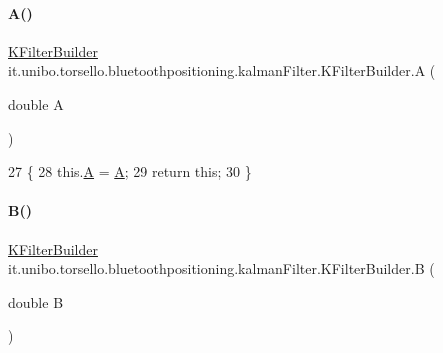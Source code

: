 \paragraph{\texorpdfstring{A()}{A()}}
{\footnotesize\ttfamily \hyperlink{classit_1_1unibo_1_1torsello_1_1bluetoothpositioning_1_1kalmanFilter_1_1KFilterBuilder}{K\+Filter\+Builder} it.\+unibo.\+torsello.\+bluetoothpositioning.\+kalman\+Filter.\+K\+Filter\+Builder.\+A (\begin{DoxyParamCaption}\item[{double}]{A }\end{DoxyParamCaption})}


\begin{DoxyCode}
27                                       \{
28         this.\hyperlink{classit_1_1unibo_1_1torsello_1_1bluetoothpositioning_1_1kalmanFilter_1_1KFilterBuilder_aad2f769a976e0881bc28e382300f6ebd_aad2f769a976e0881bc28e382300f6ebd}{A} = \hyperlink{classit_1_1unibo_1_1torsello_1_1bluetoothpositioning_1_1kalmanFilter_1_1KFilterBuilder_aad2f769a976e0881bc28e382300f6ebd_aad2f769a976e0881bc28e382300f6ebd}{A};
29         \textcolor{keywordflow}{return} \textcolor{keyword}{this};
30     \}
\end{DoxyCode}
\hypertarget{classit_1_1unibo_1_1torsello_1_1bluetoothpositioning_1_1kalmanFilter_1_1KFilterBuilder_af82fc18e727614054e76b74d058c9d83_af82fc18e727614054e76b74d058c9d83}{}\label{classit_1_1unibo_1_1torsello_1_1bluetoothpositioning_1_1kalmanFilter_1_1KFilterBuilder_af82fc18e727614054e76b74d058c9d83_af82fc18e727614054e76b74d058c9d83} 
\paragraph{\texorpdfstring{B()}{B()}}
{\footnotesize\ttfamily \hyperlink{classit_1_1unibo_1_1torsello_1_1bluetoothpositioning_1_1kalmanFilter_1_1KFilterBuilder}{K\+Filter\+Builder} it.\+unibo.\+torsello.\+bluetoothpositioning.\+kalman\+Filter.\+K\+Filter\+Builder.\+B (\begin{DoxyParamCaption}\item[{double}]{B }\end{DoxyParamCaption})}


